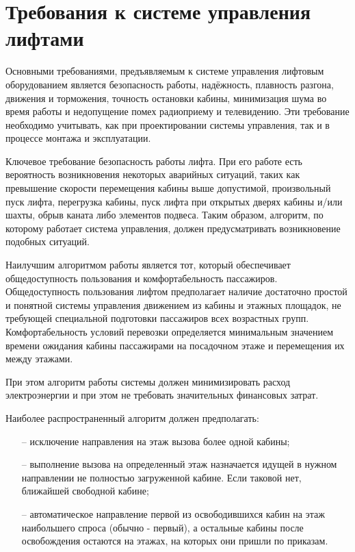 \section{Требования к системе управления лифтами}

	Основными требованиями, предъявляемым к системе управления лифтовым оборудованием является безопасность работы,
		надёжность, плавность разгона, движения и торможения,
		точность остановки кабины, минимизация шума во время работы и недопущение помех
		радиоприему и телевидению. Эти требование необходимо учитывать,
		как при проектировании системы управления, так и в процессе монтажа и эксплуатации.
		
	Ключевое требование безопасность работы лифта. При его работе есть вероятность возникновения некоторых аварийных ситуаций, таких как превышение скорости перемещения кабины выше допустимой, произвольный пуск лифта, перегрузка кабины, пуск лифта при открытых дверях кабины и/или шахты, обрыв каната либо элементов подвеса. Таким образом, алгоритм, по которому работает система управления, должен предусматривать возникновение подобных ситуаций.
	
	Наилучшим алгоритмом работы является тот, который обеспечивает общедоступность пользования и комфортабельность пассажиров. Общедоступность пользования лифтом предполагает наличие достаточно простой и понятной системы управления движением из кабины и этажных площадок, не требующей специальной подготовки пассажиров всех возрастных групп. Комфортабельность условий перевозки определяется минимальным значением времени ожидания кабины пассажирами на посадочном этаже и перемещения их между этажами.

	При этом алгоритм работы системы должен минимизировать расход электроэнергии и при этом не требовать значительных финансовых затрат.

	Наиболее распространенный алгоритм должен предполагать:
		\begin{itemize}
			\item[--] исключение направления на этаж вызова более одной кабины;
			\item[--] выполнение вызова на определенный этаж назначается идущей в нужном направлении не полностью загруженной кабине. Если таковой нет, ближайшей свободной кабине;
			\item[--] автоматическое направление первой из освободившихся кабин на этаж наибольшего спроса (обычно - первый), а остальные кабины после освобождения остаются на этажах, на которых они пришли по приказам.
		\end{itemize}
	
